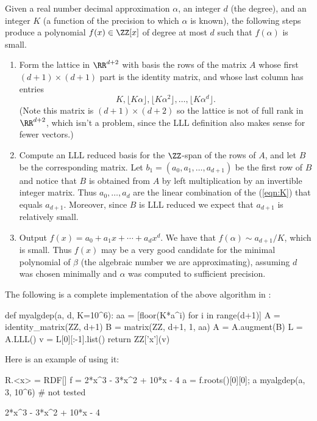 Given a real number decimal approximation $\alpha$, an
integer $d$ (the degree), and an integer $K$ (a function
of the precision to which $\alpha$ is known), the following
steps produce a polynomial $f(x) \in \ZZ[x]$ of degree
at most $d$ such that $f(\alpha)$ is small.
\begin{enumerate}
  \item Form the lattice in $\RR^{d+2}$ with basis the rows
  of the matrix $A$ whose first $(d+1) \times (d+1)$ part is the
  identity matrix, and whose last column has entries
  \begin{equation}\label{eqn:K}
    K, \lfloor K\alpha \rfloor, \lfloor K\alpha^2 \rfloor,
    \dots, \lfloor K\alpha^{d} \rfloor.
  \end{equation}
  (Note this matrix is $(d+1) \times (d+2)$ so the lattice
  is not of full rank in $\RR^{d+2}$, which isn't a problem,
  since the LLL definition also makes sense for fewer vectors.)

  \item Compute an LLL reduced basis for the $\ZZ$-span of the rows
  of $A$, and let $B$ be the corresponding matrix.
  Let $b_1 = (a_0, a_1, \dots, a_{d+1})$ be the first
  row of $B$ and notice that $B$ is obtained from $A$
  by left multiplication by an invertible integer matrix.
  Thus $a_0,\dots, a_d$ are the linear combination of the
  (\ref{eqn:K}) that equals $a_{d+1}$. Moreover, since $B$
  is LLL reduced we expect that $a_{d+1}$ is relatively small.

  \item Output $f(x) = a_0 + a_1 x + \cdots + a_{d} x^d$.
  We have that $f(\alpha) \sim a_{d+1}/K$, which is small.
  Thus $f(x)$ may be a very good candidate for the minimal
  polynomial of $\beta$ (the algebraic number we are approximating),
  assuming $d$ was chosen minimally and $\alpha$ was computed
  to sufficient precision.
\end{enumerate}

The following is a complete implementation of the above algorithm
in {\Sage}:
\begin{sagecode}
\begin{sagecell}
def myalgdep(a, d, K=10^6):
    aa = [floor(K*a^i) for i in range(d+1)]
    A = identity_matrix(ZZ, d+1)
    B = matrix(ZZ, d+1, 1, aa)
    A = A.augment(B)
    L = A.LLL()
    v = L[0][:-1].list()
    return ZZ['x'](v)
\end{sagecell}
\end{sagecode} %

Here is an example of using it:
\begin{sagecode} %
\begin{sagecell}
R.<x> = RDF[]
f = 2*x^3 - 3*x^2 + 10*x - 4
a = f.roots()[0][0]; a
myalgdep(a, 3, 10^6)       # not tested
\end{sagecell}
\begin{sageout}
2*x^3 - 3*x^2 + 10*x - 4
\end{sageout}
\end{sagecode}
